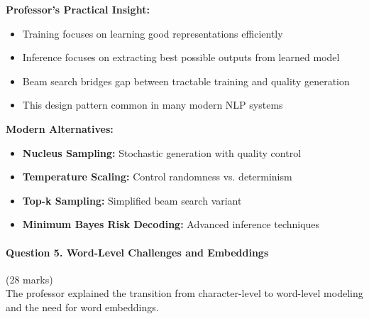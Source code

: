\documentclass[12pt]{article}
\begin{document}
\begin{enumerate}[(a)]
{    \textbf{Professor's Practical Insight:}
    \begin{itemize}
        \item Training focuses on learning good representations efficiently
        \item Inference focuses on extracting best possible outputs from learned model
        \item Beam search bridges gap between tractable training and quality generation
        \item This design pattern common in many modern NLP systems
    \end{itemize}
    
    \textbf{Modern Alternatives:}
    \begin{itemize}
        \item \textbf{Nucleus Sampling:} Stochastic generation with quality control
        \item \textbf{Temperature Scaling:} Control randomness vs. determinism
        \item \textbf{Top-k Sampling:} Simplified beam search variant
        \item \textbf{Minimum Bayes Risk Decoding:} Advanced inference techniques
    \end{itemize}
    }
\end{enumerate}

\newpage
\paragraph{Question 5. Word-Level Challenges and Embeddings}\hfill (28 marks)\\
The professor explained the transition from character-level to word-level modeling and the need for word embeddings.
\end{document}
